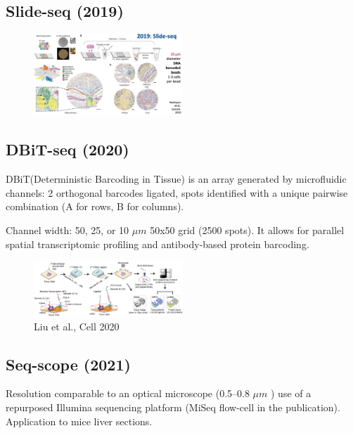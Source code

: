\hypertarget{slide-seq-2019}{%
\subsection{Slide-seq (2019)}\label{slide-seq-2019}}

\begin{figure}
\centering
\includegraphics[width=0.5\textwidth]{images/Screenshot_1.png}
\caption{}
\end{figure}

\hypertarget{dbit-seq-2020}{%
\subsection{DBiT-seq (2020)}\label{dbit-seq-2020}}

DBiT(Deterministic Barcoding in Tissue) is an array generated by
microfluidic channels: 2 orthogonal barcodes ligated, spots identified
with a unique pairwise combination (A for rows, B for columns).

Channel width: 50, 25, or 10 $\mu m$  50x50 grid (2500 spots). It allows for
parallel spatial transcriptomic profiling and antibody-based protein
barcoding.

\begin{figure}
\centering
\includegraphics[width=0.5\textwidth]{images/Screenshot_2.png}
\caption{Liu et al., Cell 2020}
\end{figure}


\hypertarget{seq-scope-2021}{%
\subsection{Seq-scope (2021)}\label{seq-scope-2021}}

Resolution comparable to an optical microscope (0.5--0.8 $\mu m$ ) use of a
repurposed Illumina sequencing platform (MiSeq flow-cell in the
publication).  Application to mice liver sections.

